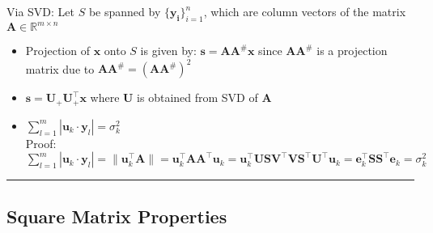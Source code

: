 Via SVD: Let $S$ be spanned by $\{\boldsymbol{y_i}\}_{i=1}^n$, which are column vectors of the matrix $\boldsymbol{A} \in \mathbb{R}^{m \times n}$
\begin{itemize}
    \item Projection of $\boldsymbol{x}$ onto $S$ is given by: $\boldsymbol{s} = \boldsymbol{A}\boldsymbol{A}^{\#}\boldsymbol{x}$ since $\boldsymbol{A}\boldsymbol{A}^{\#}$ is a projection matrix due to $\boldsymbol{A}\boldsymbol{A}^{\#} = (\boldsymbol{A}\boldsymbol{A}^{\#})^2$
    \item $\boldsymbol{s} = \boldsymbol{U}_{+} \boldsymbol{U}_{+}^\intercal \boldsymbol{x}$ where $\boldsymbol{U}$ is obtained from SVD of $\boldsymbol{A}$
    \item $\sum_{l=1}^m | \boldsymbol{u}_k \cdot \boldsymbol{y}_l |= \sigma_k^2$\\
    Proof:
    $\sum_{l=1}^m | \boldsymbol{u}_k \cdot \boldsymbol{y}_l |= \| \boldsymbol{u}_k^\intercal \boldsymbol{A} \| = \boldsymbol{u}_k^\intercal \boldsymbol{A} \boldsymbol{A}^\intercal \boldsymbol{u}_k = \boldsymbol{u}_k^\intercal \boldsymbol{U} \boldsymbol{S} \boldsymbol{V}^\intercal \boldsymbol{V} \boldsymbol{S}^\intercal \boldsymbol{U}^\intercal \boldsymbol{u}_k = \boldsymbol{e}_k^\intercal  \boldsymbol{S}  \boldsymbol{S}^\intercal \boldsymbol{e}_k = \sigma_k^2$
\end{itemize}

{\color{black}\hrule height 0.001mm}

\subsection*{Square Matrix Properties}

